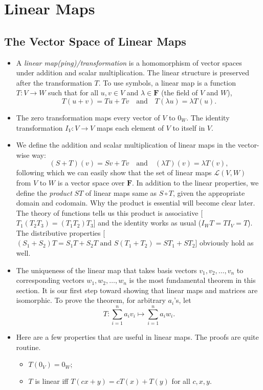 \documentclass[11pt]{article}
\newcommand{\df}[1]{\textit{\textsf{#1}}}
\newcommand{\F}{\mathbf{F}}
\begin{document}
\newpage
\section{Linear Maps}
\subsection{The Vector Space of Linear Maps}
\begin{itemize}
    \item A \df{linear map(ping)/transformation} is a homomorphism of vector spaces under addition and scalar multiplication. The linear structure is preserved after the transformation $T$. To use symbols, a linear map is a function $T: V \rightarrow W$ such that for all $u,v \in V$ and $\lambda \in \F$ (the field of $V$ and $W$),
    \begin{equation*}
        T(u+v) = Tu + Tv \quad \text{and} \quad
        T (\lambda u) = \lambda T(u).
    \end{equation*}
    \item The zero transformation maps every vector of $V$ to $0_W$. The identity transformation $I_V: V \rightarrow V$ maps each element of $V$ to itself in $V$.
    \item We define the addition and scalar multiplication of linear maps in the vector-wise way: \[(S+T)(v) = Sv + Tv \quad \text{and} \quad (\lambda T)(v) = \lambda T(v),\] following which we can easily show that the set of linear maps $\mathcal{L}(V,W)$ from $V$ to $W$ is a vector space over $\F$. In addition to the linear properties, we define the \df{product} $ST$ of linear maps same as $S \circ T$, given the appropriate domain and codomain. Why the product is essential will become clear later. The theory of functions tells us this product is associative [$T_1(T_2 T_3) = (T_1 T_2) T_3$] and the identity works as usual ($I_W T = T I_V = T$). The distributive properties [$(S_1 + S_2) T = S_1 T + S_2 T \text{ and } S(T_1 + T_2) = S T_1 + S T_2$] obviously hold as well.
    \item The uniqueness of the linear map that takes basis vectors $v_1, v_2, \dots, v_n$ to corresponding vectors $w_1, w_2, \dots, w_n$ is the most fundamental theorem in this section. It is our first step toward showing that linear maps and matrices are isomorphic. To prove the theorem, for arbitrary $a_i$'s, let \[T: \sum_{i=1}^n a_i v_i \mapsto \sum_{i=1}^n a_i w_i.\]
    \item Here are a few properties that are useful in linear maps. The proofs are quite routine.
    \begin{itemize}
        \item $T(0_V) = 0_W;$
        \item $T$ is linear iff $T(cx+y) = cT(x) + T(y)$ for all $c,x,y.$
    \end{itemize}
\end{itemize}
\end{document}
